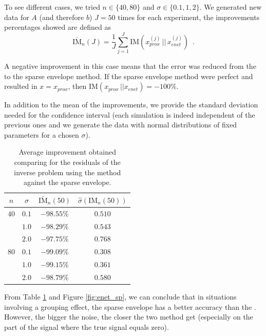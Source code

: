 To see different cases, we tried $n\in\{40, 80\}$ and $\sigma\in\{0.1,1,2\}$.
We generated new data for $A$ (and therefore $b$) $J=50$ times for each experiment, the improvements percentages showed are defined as
\[\bar{\mathrm{IM}}_{n}(J) = \frac{1}{J}\sum_{j=1}^J \mathrm{IM}(x_{prox}^{(j)}\,||\, x_{enet}^{(j)})\enspace.\]

\begin{remark}
A negative improvement in this case means that the error was reduced from the \enet to the sparse envelope method. If the sparse envelope method were perfect and resulted in $x=x_{prox}$, then $\mathrm{IM}(x_{prox}\,||x_{enet})=-100\%$. \end{remark}

In addition to the mean of the improvements, we provide the standard deviation needed for the confidence interval (each simulation is indeed independent of the previous ones and we generate the data with normal distributions of fixed parameters for a chosen $\sigma$).

\begin{table}[H]
    \centering
    \begin{tabular}{cccc}
    $n$ & $\sigma$ & $\bar{\mathrm{IM}}_n(50)$ & $\hat\sigma\left(\mathrm{IM}_n(50)\right)$\\
    \hline
    $40$     &  $0.1$ & $-98.55\%$ & $0.510$ \\
             &  $1.0$ & $-98.29\%$ & $0.543$\\
             &  $2.0$ & $-97.75\%$ & $0.768$\\  \hline
    $80$     &  $0.1$ & $-99.09\%$ & $0.308$\\
             &  $1.0$ & $-99.15\%$ & $0.361$\\
             &  $2.0$ & $-98.79\%$ & $0.580$\\
    \end{tabular}
    \caption{Average improvement obtained comparing for the residuals of the inverse problem using the \enet method against the sparse envelope.}
    \label{tab:endresults}
\end{table}

From Table \ref{tab:endresults} and Figure \ref{fig:enet_sp}, we can conclude that in situations involving a grouping effect, the sparse envelope has a better accuracy than the \enet. However, the bigger the noise, the closer the two method get (especially on the part of the signal where the true signal equals zero). 
